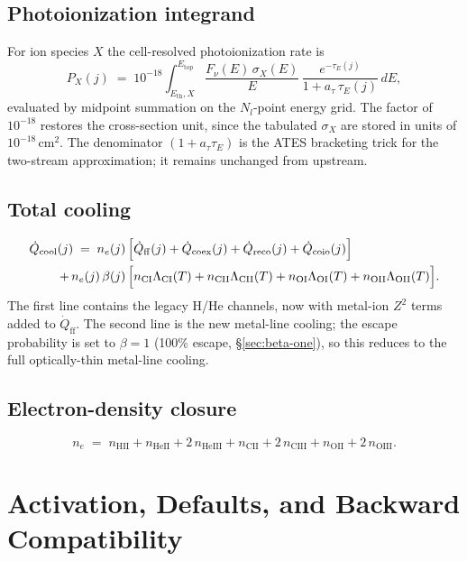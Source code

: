 \documentclass[english,a4paper]{kiseon_memo}
\begin{document}
\subsection{Photoionization integrand}

For ion species \(X\) the cell-resolved photoionization rate is
\[
  P_X(j) \;=\; 10^{-18}\!\int_{E_\mathrm{th}, X}^{E_\mathrm{top}}\!\!
  \frac{F_\nu(E)\, \sigma_X(E)}{E}\,
  \frac{e^{-\tau_E(j)}}{1 + a_\tau\,\tau_E(j)}\,dE,
\]
evaluated by midpoint summation on the \(N_l\)-point energy grid.
The factor of \(10^{-18}\) restores the cross-section unit, since the
tabulated \(\sigma_X\) are stored in units of
\(10^{-18}\,\mathrm{cm}^{2}\).  The denominator
\((1 + a_\tau\tau_E)\) is the ATES bracketing trick for the
two-stream approximation; it remains unchanged from upstream.

\subsection{Total cooling}

\begin{align}
\dot{Q}_{\mathrm{cool}}(j) \;=\;
n_e(j)\,&\Bigl[
\dot{Q}_\mathrm{ff}(j)
+ \dot{Q}_\mathrm{coex}(j)
+ \dot{Q}_\mathrm{reco}(j)
+ \dot{Q}_\mathrm{coio}(j)\Bigr] \notag\\
+\, n_e(j)\,\beta(j)\,&\Bigl[
n_\mathrm{CI}\Lambda_\mathrm{CI}(T)
+ n_\mathrm{CII}\Lambda_\mathrm{CII}(T)
+ n_\mathrm{OI}\Lambda_\mathrm{OI}(T)
+ n_\mathrm{OII}\Lambda_\mathrm{OII}(T)\Bigr].
\end{align}
The first line contains the legacy H/He channels, now with metal-ion
\(Z^{2}\) terms added to \(\dot{Q}_\mathrm{ff}\).  The second line is
the new metal-line cooling; the escape probability is set to
\(\beta = 1\) (100\% escape, \S\ref{sec:beta-one}), so this reduces to
the full optically-thin metal-line cooling.

\subsection{Electron-density closure}

\[
  n_e \;=\; n_\mathrm{HII}
          + n_\mathrm{HeII} + 2\,n_\mathrm{HeIII}
          + n_\mathrm{CII}  + 2\,n_\mathrm{CIII}
          + n_\mathrm{OII}  + 2\,n_\mathrm{OIII}.
\]

\section{Activation, Defaults, and Backward Compatibility}
\end{document}
